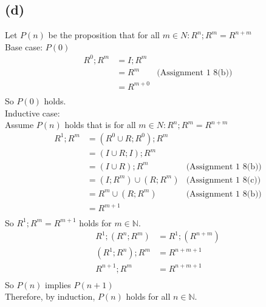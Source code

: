 \documentclass{article} %
\begin{document}
\subsection*{(d)}
Let $P(n)$ be the proposition that for all $m \in N: R^n; R^m = R^{n+m}$\\
Base case: $P(0)$\\
\[
\begin{array}{rlc}
R^{0};R^m &= I;R^m\\
        &= R^m &\mbox{(Assignment 1 8(b))}\\
        &= R^{m+0}\\
\end{array} 
\]
So $P(0)$ holds.
\\
Inductive case:\\
Assume $P(n)$ holds that is for all $m \in N: R^n; R^m = R^{n+m}$\\
\[
\begin{array}{rlc}
    R^1;R^m     &= (R^0 \cup R;R^0);R^m \\
                &= (I \cup R;I);R^m \\
                &= (I \cup R);R^m       &\mbox{(Assignment 1 8(b))}\\
                &= (I;R^m) \cup (R;R^m)   &\mbox{(Assignment 1 8(c))}\\
                &= R^m \cup (R;R^m)     &\mbox{(Assignment 1 8(b))}\\
                &= R^{m+1}\\
\end{array}
\]
So $R^1;R^m = R^{m + 1}$ holds for $m \in \mathbb{N}$.\\
\[
\begin{array}{rlc}
    R^1;(R^n;R^m)   &= R^1;(R^{n + m})    \\
    (R^1;R^n);R^m   &= R^{n + m + 1} \\
    R^{n + 1};R^{m} &= R^{n + m + 1}\\
          
\end{array}
\]
So $P(n)$ implies $P(n + 1)$\\
Therefore, by induction, $P(n)$ holds for all $n\in \mathbb{N}$.
\end{document}
